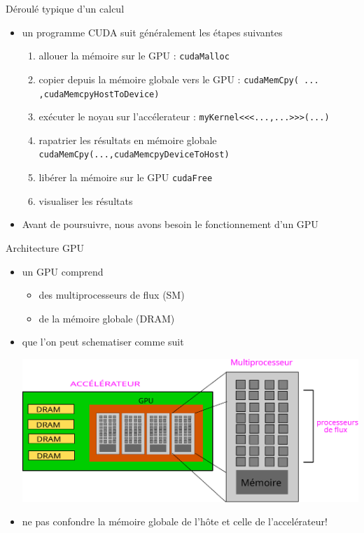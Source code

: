 \documentclass[11pt,mathserif]{beamer}
\newcommand{\scout}{\faAngellist}
\newcommand{\argi}{\faLightbulbO}
\newcommand{\kontuz}{\faExclamationTriangle}
\newcommand{\geldi}{\faHandPaperO}
\begin{document}
\begin{frame}{Déroulé typique d'un calcul}
  \lstset{basicstyle=\ttfamily}
\pause
  \begin{itemize}[<+->]
    \item[\argi] un programme CUDA suit généralement les étapes suivantes 
\begin{enumerate}[<+->]
 \item allouer la mémoire sur le GPU : \lstinline!cudaMalloc!
 \item copier depuis la mémoire globale vers le GPU : \lstinline!cudaMemCpy( ... ,cudaMemcpyHostToDevice)!
 \item exécuter le noyau sur l'accélerateur : \lstinline!myKernel<<<...,...>>>(...)!
 \item rapatrier les résultats en mémoire globale \lstinline!cudaMemCpy(...,cudaMemcpyDeviceToHost)!
 \item libérer la mémoire sur le GPU \lstinline!cudaFree!
 \item visualiser les résultats
\end{enumerate}
\item[\geldi] Avant de poursuivre, nous avons besoin le fonctionnement d'un GPU
\end{itemize}
\end{frame}
\begin{frame}{Architecture GPU}
\begin{itemize}[<+->]
  \item[\scout] un GPU comprend 
   \begin{itemize} 
     \item des multiprocesseurs de flux (SM)
     \item de la mémoire globale (DRAM)
   \end{itemize} 
  \item que l'on peut schematiser comme suit
  \begin{center}
    \includegraphics[width=0.8\linewidth]{fig/archi_gpu.eps}
  \end{center}
  \item[\kontuz] ne pas confondre la mémoire globale de l'hôte et celle de l'accelérateur!
\end{itemize}
\end{frame}
\end{document}

